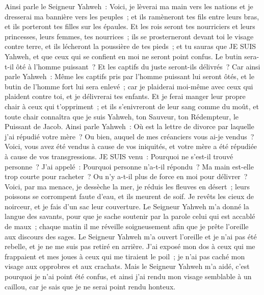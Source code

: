 \begin{multicols}{2}
Ainsi parle le Seigneur Yahweh~: Voici, je lèverai ma main vers les nations et je dresserai ma bannière vers les peuples~; et ils ramèneront tes fils entre leurs bras, et ils porteront tes filles sur les épaules.
Et les rois seront tes nourriciers et leurs princesses, leurs femmes, tes nourrices~; ils se prosterneront devant toi le visage contre terre, et ils lécheront la poussière de tes pieds~; et tu sauras que JE SUIS Yahweh, et que ceux qui se confient en moi ne seront point confus.
Le butin sera-t-il ôté à l'homme puissant~? Et les captifs du juste seront-ils délivrés~?
Car ainsi parle Yahweh~: Même les captifs pris par l'homme puissant lui seront ôtés, et le butin de l'homme fort lui sera enlevé~; car je plaiderai moi-même avec ceux qui plaident contre toi, et je délivrerai tes enfants.
Et je ferai manger leur propre chair à ceux qui t'oppriment~; et ils s'enivreront de leur sang comme du moût, et toute chair connaîtra que je suis Yahweh, ton Sauveur, ton Rédempteur, le Puissant de Jacob.
\VerseOne{}Ainsi parle Yahweh~: Où est la lettre de divorce par laquelle j'ai répudié votre mère~? Ou bien, auquel de mes créanciers vous ai-je vendus~? Voici, vous avez été vendus à cause de vos iniquités, et votre mère a été répudiée à cause de vos transgressions.
JE SUIS venu~: Pourquoi ne s'est-il trouvé personne~? J'ai appelé~: Pourquoi personne n'a-t-il répondu~? Ma main est-elle trop courte pour racheter~? Ou n'y a-t-il plus de force en moi pour délivrer~? Voici, par ma menace, je dessèche la mer, je réduis les fleuves en désert~; leurs poissons se corrompent faute d'eau, et ils meurent de soif.
Je revêts les cieux de noirceur, et je fais d'un sac leur couverture.
Le Seigneur Yahweh m'a donné la langue des savants, pour que je sache soutenir par la parole celui qui est accablé de maux~; chaque matin il me réveille soigneusement afin que je prête l'oreille aux discours des sages.
Le Seigneur Yahweh m'a ouvert l'oreille et je n'ai pas été rebelle, et je ne me suis pas retiré en arrière.
J'ai exposé mon dos à ceux qui me frappaient et mes joues à ceux qui me tiraient le poil~; je n'ai pas caché mon visage aux opprobres et aux crachats.
Mais le Seigneur Yahweh m'a aidé, c'est pourquoi je n'ai point été confus, et ainsi j'ai rendu mon visage semblable à un caillou, car je sais que je ne serai point rendu honteux.

\end{multicols}

